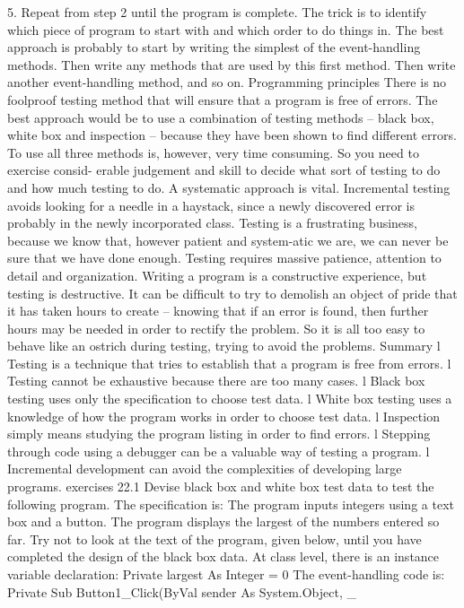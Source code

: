 5.	Repeat from step 2 until the program is complete.
The trick is to identify which piece of program to start with and which order to do things in. The best approach is probably to start by writing the simplest of the event-handling methods. Then write any methods that are used by this ﬁrst method. Then write another event-handling method, and so on.
Programming principles
There is no foolproof testing method that will ensure that a program is free of errors. The best approach would be to use a combination of testing methods – black box, white box and inspection – because they have been shown to ﬁnd different errors. To use all three methods is, however, very time consuming. So you need to exercise consid-
erable judgement and skill to decide what sort of testing to do and how much testing to do. A systematic approach is vital.
Incremental testing avoids looking for a needle in a haystack, since a newly discovered error is probably in the newly incorporated class.
Testing is a frustrating business, because we know that, however patient and system-atic we are, we can never be sure that we have done enough. Testing requires massive patience, attention to detail and organization.
Writing a program is a constructive experience, but testing is destructive. It can be difﬁcult to try to demolish an object of pride that it has taken hours to create – knowing that if an error is found, then further hours may be needed in order to rectify the problem. So it is all too easy to behave like an ostrich during testing, trying to avoid 
the problems.
Summary
l	Testing is a technique that tries to establish that a program is free from errors.
l	Testing cannot be exhaustive because there are too many cases.
l	Black box testing uses only the speciﬁcation to choose test data.
l	White box testing uses a knowledge of how the program works in order to choose test data.
l	Inspection simply means studying the program listing in order to ﬁnd errors.
l	Stepping through code using a debugger can be a valuable way of testing a 
program.
l	Incremental development can avoid the complexities of developing large 
programs.
exercises
22.1	Devise black box and white box test data to test the following program. The speciﬁcation is:
The program inputs integers using a text box and a button. The program displays the largest of the numbers entered so far.
	Try not to look at the text of the program, given below, until you have completed the design of the black box data.
At class level, there is an instance variable declaration:
Private largest As Integer = 0
	The event-handling code is:
Private Sub Button1_Click(ByVal sender As System.Object, _
